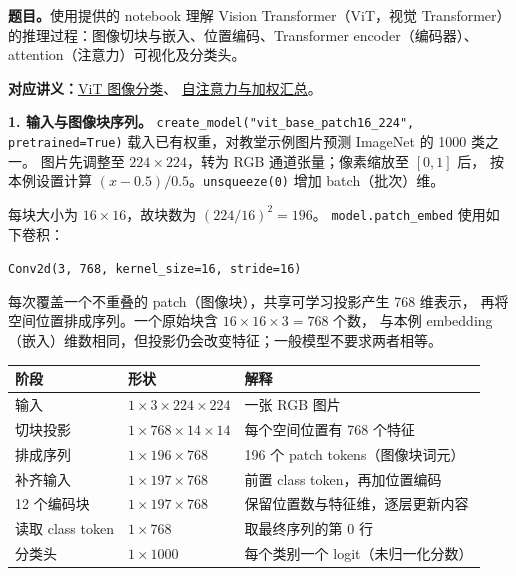 
\begingroup
\renewcommand{\recordid}[1]{}
\renewcommand{\relatedtopic}[2]{\hyperref[topic:#1]{#2}}
\label{tutorial:SC4001-TUT10}

\nopagebreak[4]
\textbf{题目。}使用提供的 notebook 理解 Vision Transformer（ViT，视觉 Transformer）
的推理过程：图像切块与嵌入、位置编码、Transformer encoder（编码器）、
attention（注意力）可视化及分类头。

\textbf{对应讲义：}\relatedtopic{SC4001-L10-T02}{ViT 图像分类}、
\relatedtopic{SC4001-L09-T02}{自注意力与加权汇总}。

\textbf{1. 输入与图像块序列。}
\texttt{create\_model("vit\_base\_patch16\_224", pretrained=True)}
载入已有权重，对教堂示例图片预测 ImageNet 的 1000 类之一。
图片先调整至 $224\times224$，转为 RGB 通道张量；像素缩放至 $[0,1]$ 后，
按本例设置计算 $(x-0.5)/0.5$。\texttt{unsqueeze(0)} 增加 batch（批次）维。

每块大小为 $16\times16$，故块数为 $(224/16)^2=196$。
\texttt{model.patch\_embed} 使用如下卷积：
\begin{center}
\small\texttt{Conv2d(3, 768, kernel\_size=16, stride=16)}
\end{center}
每次覆盖一个不重叠的 patch（图像块），共享可学习投影产生 768 维表示，
再将空间位置排成序列。一个原始块含 $16\times16\times3=768$ 个数，
与本例 embedding（嵌入）维数相同，但投影仍会改变特征；一般模型不要求两者相等。

\begin{center}
\small
\begin{tabularx}{\textwidth}{@{}l l X@{}}
\toprule
阶段 & 形状 & 解释 \\
\midrule
输入 & $1\times3\times224\times224$ & 一张 RGB 图片 \\
切块投影 & $1\times768\times14\times14$ & 每个空间位置有 768 个特征 \\
排成序列 & $1\times196\times768$ & 196 个 patch tokens（图像块词元） \\
补齐输入 & $1\times197\times768$ & 前置 class token，再加位置编码 \\
12 个编码块 & $1\times197\times768$ & 保留位置数与特征维，逐层更新内容 \\
读取 class token & $1\times768$ & 取最终序列的第 0 行 \\
分类头 & $1\times1000$ & 每个类别一个 logit（未归一化分数） \\
\bottomrule
\end{tabularx}
\end{center}

